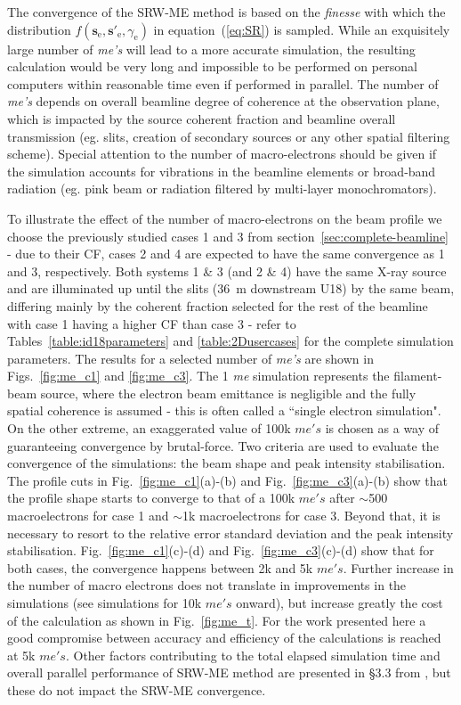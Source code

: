 \documentclass{iucr}              %
\begin{document}
The convergence of the SRW-ME method is based on the \textit{finesse} with which the distribution $f(\textbf{s}_\text{e}, \textbf{s}'_\text{e}, \gamma_\text{e})$  in equation~(\ref{eq:SR}) is sampled. While an exquisitely large number of \textit{me's} will lead to a more accurate simulation, the resulting calculation would be very long and impossible to be performed on personal computers within reasonable time even if performed in parallel. The number of \textit{me's} depends on overall beamline degree of coherence at the observation plane, which is impacted by the source coherent fraction and beamline overall transmission (eg. slits, creation of secondary sources or any other spatial filtering scheme). Special attention to the number of macro-electrons should be given if the simulation accounts for vibrations in the beamline elements or broad-band radiation (eg. pink beam or radiation filtered by multi-layer monochromators).

To illustrate the effect of the number of macro-electrons on the beam profile we choose the previously studied cases 1 and 3 from section~\ref{sec:complete-beamline} - due to their CF, cases 2 and 4 are expected to have the same convergence as 1 and 3, respectively. Both systems 1 \& 3 (and 2 \& 4) have the same X-ray source and are illuminated up until the slits (36~m downstream U18) by the same beam, differing mainly by the coherent fraction selected for the rest of the beamline with case 1 having a higher CF than case 3 - refer to Tables~\ref{table:id18parameters} and \ref{table:2Dusercases} for the complete simulation parameters. The results for a selected number of \textit{me's} are shown in Figs.~\ref{fig:me_c1} and \ref{fig:me_c3}. The 1 \textit{me} simulation represents the filament-beam source, where the electron beam emittance is negligible and the fully spatial coherence is assumed - this is often called a ``single electron simulation". On the other extreme, an exaggerated value of 100k $me's$ is chosen as a way of guaranteeing convergence by brutal-force. Two criteria are used to evaluate the convergence of the simulations: the beam shape and peak intensity stabilisation. The profile cuts in  Fig.~\ref{fig:me_c1}(a)-(b) and Fig.~\ref{fig:me_c3}(a)-(b) show that the profile shape starts to converge to that of a 100k $me's$ after $\sim$500 macroelectrons for case 1 and $\sim$1k macroelectrons for case 3. Beyond that, it is necessary to resort to the relative error standard deviation and the peak intensity stabilisation. Fig.~\ref{fig:me_c1}(c)-(d) and Fig.~\ref{fig:me_c3}(c)-(d) show that for both cases, the convergence happens between 2k and 5k $me's$. Further increase in the number of macro electrons does not translate in improvements in the simulations (see simulations for 10k $me's$ onward), but increase greatly the cost of the calculation as shown in Fig.~\ref{fig:me_t}. For the work presented here a good compromise between accuracy and efficiency of the calculations is reached at 5k $me's$. Other factors contributing to the total elapsed simulation time and overall parallel performance of SRW-ME method are presented in \S3.3 from \cite{codeSRW_MEscan}, but these do not impact the SRW-ME convergence.
\end{document}
